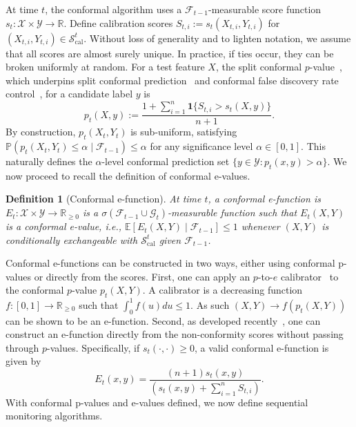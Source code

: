 \documentclass{uai2026} %
\newtheorem{definition}[theorem]{Definition}
\newcommand{\R}{\mathbb{R}}
\newcommand{\1}{\mathbf{1}}
\newcommand{\ind}[1]{\mathbf{1}\{#1\}}
\newcommand{\prob}{\mathbb{P}}
\newcommand{\expec}{\mathbb{E}}
\newcommand{\xcal}{\mathcal{X}}
\newcommand{\ycal}{\mathcal{Y}}
\newcommand{\scal}{\mathcal{S}}
\newcommand{\F}{\mathcal{F}}
\newcommand{\G}{\mathcal{G}}
\newcommand{\fcal}{\F}
\newcommand{\cali}{\mathrm{cal}}
\newcommand{\scalcal}{\scal_{\cali}}
\begin{document}
At time $t$, the conformal algorithm uses a $\fcal_{t-1}$-measurable score function $s_t:\xcal\times\ycal\to\R$. Define calibration scores $S_{t,i}:=s_t(X_{t,i},Y_{t,i})$ for $(X_{t,i},Y_{t,i})\in \scalcal^t$. Without loss of generality and to lighten notation, we assume that all scores are almost surely unique. In practice, if ties occur, they can be broken uniformly at random. For a test feature $X$, the split conformal $p$-value~\citep{papadopoulos2002inductive,papadopoulos2008inductive}, which underpins split conformal prediction~\citep{lei2018distribution,romano2019conformalized} and conformal false discovery rate control~\citep{bates2023testing,jin2023selection}, for a candidate label $y$ is
\begin{equation}
  \label{eq:pt-def}
  p_t(X,y):=\frac{1+\sum_{i=1}^{n}\ind{S_{t,i}>s_t(X,y)}}{n+1}.
\end{equation}
By construction, $p_t(X_t, Y_t)$ is sub-uniform, satisfying $\prob(p_t(X_t, Y_t) \le \alpha \mid \F_{t-1}) \le \alpha$ for any significance level $\alpha \in [0,1]$. This naturally defines the $\alpha$-level conformal prediction set $\{y \in \ycal : p_t(x,y) > \alpha\}$. We now proceed to recall the definition of conformal e-values.

\begin{definition}[Conformal e-function]
  At time $t$, a \emph{conformal e-function} is $E_t:\xcal\times\ycal\to\R_{\ge 0}$ is a $\sigma(\F_{t-1} \cup \G_t)$-measurable function such that $E_t(X,Y)$ is a \emph{conformal e-value}, i.e.,  $\expec[E_t(X,Y) \mid \F_{t-1}] \le 1$ whenever $(X,Y)$ is conditionally exchangeable with $\scalcal^t$ given $\F_{t-1}$.
\end{definition}

Conformal e-functions can be constructed in two ways, either using conformal p-values or directly from the scores. First, one can apply an $p$-to-$e$ calibrator~\citep{vovk2021values} to the conformal $p$-value $p_t(X,Y)$. A calibrator is a decreasing function $f:[0,1]\to\R_{\ge 0}$ such that $\int_0^1 f(u) du \le 1$. As such $(X,Y) \to f(p_t(X,Y))$ can be shown to be an e-function. Second, as developed recently~\citep{balinsky2024enhancing,gauthier2025values}, one can construct an e-function directly from the non-conformity scores without passing through $p$-values. Specifically, if $s_t(\cdot, \cdot) \ge 0$, a valid conformal e-function is given by
\begin{equation*}
  E_t(x, y) = \frac{(n+1)s_t(x,y)}{\left( s_t(x,y) + \sum_{i=1}^n S_{t,i} \right)}.
\end{equation*}
With conformal p-values and e-values defined, we now define sequential monitoring algorithms.
\end{document}

